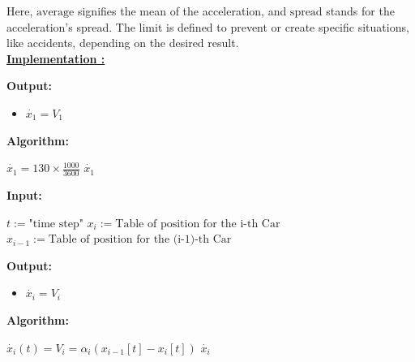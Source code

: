 \documentclass{article}
\begin{document}
			Here, \( \text{average} \) signifies the mean of the acceleration, and \( \text{spread} \) stands for the acceleration's spread. The limit is defined to prevent or create specific situations, like accidents, depending on the desired result. \\
			
			
			\textbf{\underline{Implementation : }}
			
			\begin{algorithm}[H]
				\caption{$\dot{x_1}$}\label{alg:x1_dot}
				\begin{algorithmic}
					\State \textbf{Output:} \\
					\begin{itemize}[]
						\item $\dot{x_1}=V_1$
					\end{itemize}
					\State \textbf{Algorithm:} \\
					\begin{itemize}[]
						\State $\dot{x_1}=130 \times \frac{1000}{3600}$ 
						\State \Return $\dot{x_1}$ 
					\end{itemize}		
				\end{algorithmic}
			\end{algorithm}
			
			\begin{algorithm}[H]
				\caption{$\dot{x_i}$}\label{alg:xi_dot}
				\begin{algorithmic}
					\State \textbf{Input:} \\
					\begin{itemize}
					\State $t:=\text{"time  step"}$
					\State$x_i:=\text{Table of position for the i-th Car}$
					\State$x_{i-1}:=\text{Table of position for the (i-1)-th Car}$
					\end{itemize}
					\State \textbf{Output:} \\
					\begin{itemize}[]
						\item $\dot{x_i}=V_i$
					\end{itemize}
					\State \textbf{Algorithm:} \\
					\begin{itemize}[]
						\State $\dot{x_i}(t) = V_i = \alpha_i(x_{i-1}[t] - x_i[t])$ 
						\State \Return $\dot{x_i}$ 
					\end{itemize}		
				\end{algorithmic}
			\end{algorithm}
			
\end{document}
